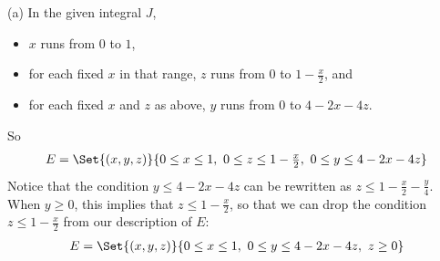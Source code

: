 \begin{solution}
(a) In the given integral $J$,
\begin{itemize}
\item
$x$ runs from $0$ to $1$,
\item
for each fixed $x$ in that range, $z$ runs from 0 to $1-\frac{x}{2}$, and
\item
for each fixed $x$ and $z$ as above, $y$ runs from $0$ to $4-2x-4z$.
\end{itemize}
So 
\begin{align*}
E = \Set{(x,y,z)}{0\le x\le 1,\ 0\le z\le 1-\tfrac{x}{2},\ 
            0 \le y\le 4-2x-4z}
\end{align*}
Notice that the condition $y\le 4-2x-4z$ can be rewritten
as $z\le 1-\frac{x}{2} -\frac{y}{4}$. When $y\ge 0$, this implies
that $z\le 1-\frac{x}{2}$, so that we can drop the condition 
$z\le 1-\frac{x}{2}$ from our description of $E$:
\begin{align*}
E = \Set{(x,y,z)}{0\le x\le 1,\ 0 \le y\le 4-2x-4z,\ z\ge 0}
\end{align*}




\end{solution}
